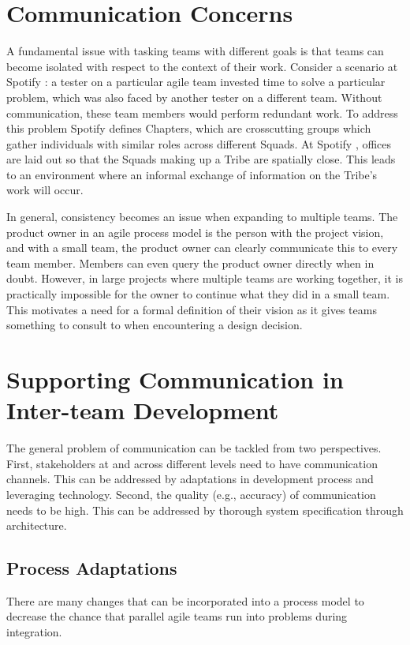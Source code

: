 ﻿\section{Communication Concerns}\label{sec:spt_ex} 
A fundamental issue with tasking teams with different goals is that teams can become isolated with respect to the context of their work.
Consider a scenario at Spotify \cite{kniberg12}: a tester on a particular agile team invested time to solve a particular problem, which was also faced by another tester on a different team. Without communication, these team members would perform redundant work.
To address this problem Spotify defines Chapters, which are crosscutting groups which gather individuals with similar roles across different Squads. 
At Spotify \cite{kniberg12}, offices are laid out so that the Squads making up a Tribe are spatially close. This leads to an environment where an informal exchange of information on the Tribe's work will occur.

In general, consistency becomes an issue when expanding to multiple teams.
The product owner in an agile process model is the person with the project vision, and with a small team, the product owner can clearly communicate this to every team member.
Members can even query the product owner directly when in doubt.
However, in large projects where multiple teams are working together, it is practically impossible for the owner to continue what they did in a small team.
This motivates a need for a formal definition of their vision as it gives teams something to consult to when encountering a design decision.

\section{Supporting Communication in Inter-team Development}
\label{sec:prop_appro} 
The general problem of communication can be tackled from two perspectives.
First, stakeholders at and across different levels need to have communication channels.
This can be addressed by adaptations in development process and leveraging technology.
Second, the quality (e.g., accuracy) of communication needs to be high.
This can be addressed by thorough system specification through architecture.

\subsection{Process Adaptations} 
\label{sec:proc_impv}
	There are many changes \cite{collabAcrossAgile_article} that can be incorporated into a process model to decrease the chance that parallel agile teams run into problems during integration.

